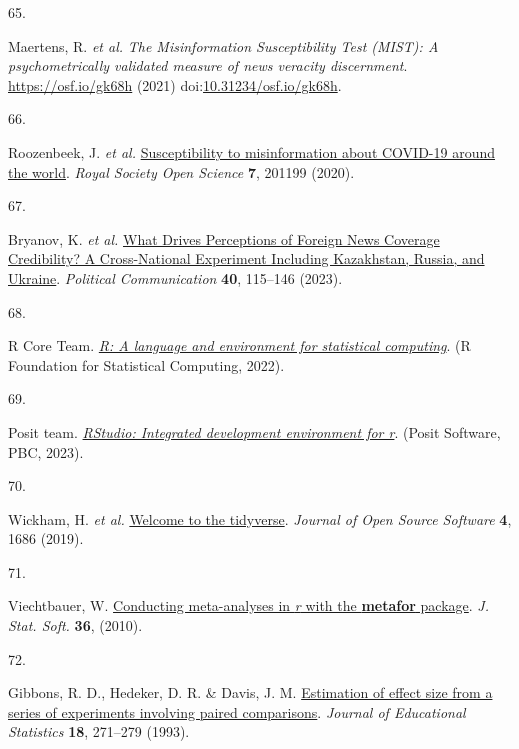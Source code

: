 \documentclass[
  doc,floatsintext]{apa6}
\newlength{\cslhangindent}
\newlength{\csllabelwidth}
\newenvironment{CSLReferences}[2] %
 {\begin{list}{}{%
  \setlength{\itemindent}{0pt}
  \setlength{\leftmargin}{0pt}
  \setlength{\parsep}{0pt}
  \ifodd #1
   \setlength{\leftmargin}{\cslhangindent}
   \setlength{\itemindent}{-1\cslhangindent}
  \fi
  \setlength{\itemsep}{#2\baselineskip}}}
 {\end{list}}
\newcommand{\CSLLeftMargin}[1]{\parbox[t]{\csllabelwidth}{\strut#1\strut}}
\newcommand{\CSLRightInline}[1]{\parbox[t]{\linewidth - \csllabelwidth}{\strut#1\strut}}
\begin{document}
\begin{CSLReferences}{0}{0}
\CSLLeftMargin{65. }%
\CSLRightInline{Maertens, R. \emph{et al.} \emph{The Misinformation Susceptibility Test (MIST): A psychometrically validated measure of news veracity discernment}. \url{https://osf.io/gk68h} (2021) doi:\href{https://doi.org/10.31234/osf.io/gk68h}{10.31234/osf.io/gk68h}.}

\CSLLeftMargin{66. }%
\CSLRightInline{Roozenbeek, J. \emph{et al.} \href{https://doi.org/10.1098/rsos.201199}{Susceptibility to misinformation about COVID-19 around the world}. \emph{Royal Society Open Science} \textbf{7}, 201199 (2020).}

\CSLLeftMargin{67. }%
\CSLRightInline{Bryanov, K. \emph{et al.} \href{https://doi.org/10.1080/10584609.2023.2172492}{What Drives Perceptions of Foreign News Coverage Credibility? A Cross-National Experiment Including Kazakhstan, Russia, and Ukraine}. \emph{Political Communication} \textbf{40}, 115--146 (2023).}

\CSLLeftMargin{68. }%
\CSLRightInline{R Core Team. \emph{\href{https://www.R-project.org/}{R: A language and environment for statistical computing}}. (R Foundation for Statistical Computing, 2022).}

\CSLLeftMargin{69. }%
\CSLRightInline{Posit team. \emph{\href{http://www.posit.co/}{RStudio: Integrated development environment for r}}. (Posit Software, PBC, 2023).}

\CSLLeftMargin{70. }%
\CSLRightInline{Wickham, H. \emph{et al.} \href{https://doi.org/10.21105/joss.01686}{Welcome to the tidyverse}. \emph{Journal of Open Source Software} \textbf{4}, 1686 (2019).}

\CSLLeftMargin{71. }%
\CSLRightInline{Viechtbauer, W. \href{https://doi.org/10.18637/jss.v036.i03}{Conducting meta-analyses in \emph{r} with the \textbf{metafor} package}. \emph{J. Stat. Soft.} \textbf{36}, (2010).}

\CSLLeftMargin{72. }%
\CSLRightInline{Gibbons, R. D., Hedeker, D. R. \& Davis, J. M. \href{https://doi.org/10.3102/10769986018003271}{Estimation of effect size from a series of experiments involving paired comparisons}. \emph{Journal of Educational Statistics} \textbf{18}, 271--279 (1993).}


\end{CSLReferences}
\end{document}
